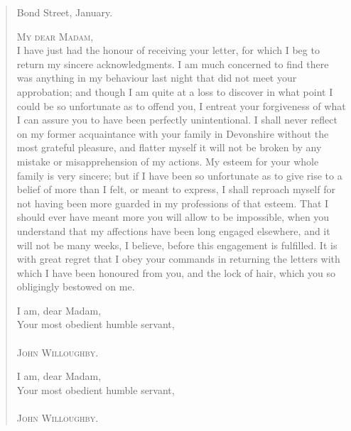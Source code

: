 \begin{quotation}
\begin{flushright}
Bond Street, January.
\end{flushright}

\noindent \textsc{My dear Madam},
~\\
\indent    I have just had the honour of receiving your letter, for which I beg to return my sincere acknowledgments. I am much concerned to find there was anything in my behaviour last night that did not meet your approbation; and though I am quite at a loss to discover in what point I could be so unfortunate as to offend you, I entreat your forgiveness of what I can assure you to have been perfectly unintentional. I shall never reflect on my former acquaintance with your family in Devonshire without the most grateful pleasure, and flatter myself it will not be broken by any mistake or misapprehension of my actions. My esteem for your whole family is very sincere; but if I have been so unfortunate as to give rise to a belief of more than I felt, or meant to express, I shall reproach myself for not having been more guarded in my professions of that esteem. That I should ever have meant more you will allow to be impossible, when you understand that my affections have been long engaged elsewhere, and it will not be many weeks, I believe, before this engagement is fulfilled. It is with great regret that I obey your commands in returning the letters with which I have been honoured from you, and the lock of hair, which you so obligingly bestowed on me.

\makeatletter
{}
{%
	\begin{flushright}
	\begin{minipage}{.5\textwidth}
	I am, dear Madam,\\                      
	Your most obedient humble servant,\\    
	~\\
	\textsc{John Willoughby}.
	\end{minipage}
	\end{flushright}
}{%
	\begin{flushright}
	\begin{minipage}{.3\textwidth}
	I am, dear Madam,\\                      
	Your most obedient humble servant,\\    
	~\\
	\textsc{John Willoughby}.
	\end{minipage}
	\end{flushright}
}
\makeatother


\end{quotation}

